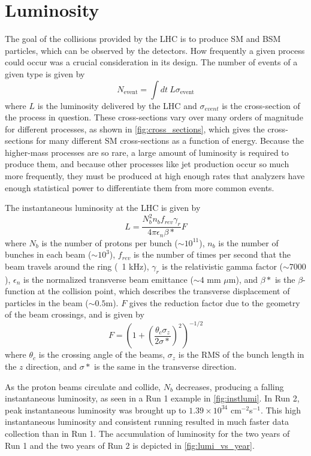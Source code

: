 \section{Luminosity}

The goal of the collisions provided by the \ac{LHC} is to produce \ac{SM} and \ac{BSM} particles, which can be observed by the detectors. How frequently a given process could occur was a crucial consideration in its design. The number of events of a given type is given by
%
\begin{equation}
N_\text{event} = \int dt\ L\sigma_\text{event}
\end{equation}
%
where $L$ is the luminosity delivered by the \ac{LHC} and $\sigma_{event}$ is the cross-section of the process in question. These cross-sections vary over many orders of magnitude for different processes, as shown in \autoref{fig:cross_sections}, which gives the cross-sections for many different \ac{SM} cross-sections as a function of energy. Because the higher-mass processes are so rare, a large amount of luminosity is required to produce them, and because other processes like jet production occur so much more frequently, they must be produced at high enough rates that analyzers have enough statistical power to differentiate them from more common events.   

The instantaneous luminosity at the \ac{LHC} is given by
%
\begin{equation}
L = \frac{ N^2_b n_b f_{rev} \gamma_r }{ 4\pi \epsilon_n \beta* } F
\end{equation}
%
where $N_b$ is the number of protons per bunch ($\sim10^{11}$), $n_b$ is the number of bunches in each beam ($\sim10^3$), $f_{rev}$ is the number of times per second that the beam travels around the ring (~1 kHz), $\gamma_r$ is the relativistic gamma factor ($\sim 7000$), $\epsilon_n$ is the normalized transverse beam emittance ($\sim 4$ mm $\mu$m), and $\beta*$ is the $\beta$-function at the collision point, which describes the transverse displacement of particles in the beam ($\sim 0.5$m). $F$ gives the reduction factor due to the geometry of the beam crossings, and is given by
%
\begin{equation}
F = (1+ (\frac{\theta_c \sigma_z}{2\sigma*})^2)^{-1/2}
\end{equation}
%
where $\theta_c$ is the crossing angle of the beams, $\sigma_z$ is the RMS of the bunch length in the $z$ direction, and $\sigma*$ is the same in the transverse direction.

As the proton beams circulate and collide, $N_b$ decreases, producing a falling instantaneous luminosity, as seen in a Run 1 example in \autoref{fig:instlumi}. In Run 2, peak instantaneous luminosity was brought up to $1.39 \times 10^{34}$ cm$^{-2}$s$^{-1}$. This high instantaneous luminosity and consistent running resulted in much faster data collection than in Run 1. The accumulation of luminosity for the two years of Run 1 and the two years of Run 2 is depicted in \autoref{fig:lumi_vs_year}. 

